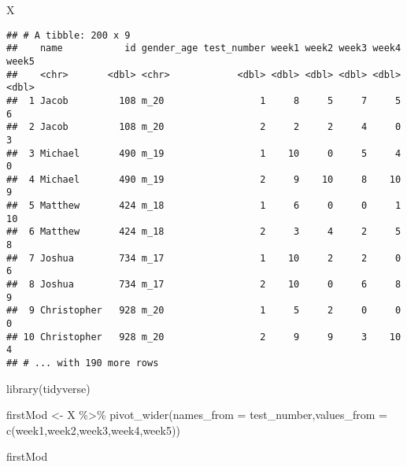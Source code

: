\documentclass[
]{article}
\newenvironment{Shaded}{\begin{snugshade}}{\end{snugshade}}
\newcommand{\AttributeTok}[1]{\textcolor[rgb]{0.77,0.63,0.00}{#1}}
\newcommand{\FunctionTok}[1]{\textcolor[rgb]{0.00,0.00,0.00}{#1}}
\newcommand{\NormalTok}[1]{#1}
\newcommand{\OtherTok}[1]{\textcolor[rgb]{0.56,0.35,0.01}{#1}}
\newcommand{\SpecialCharTok}[1]{\textcolor[rgb]{0.00,0.00,0.00}{#1}}
\begin{document}
\begin{Shaded}
\begin{Highlighting}[]
\NormalTok{X}
\end{Highlighting}
\end{Shaded}

\begin{verbatim}
## # A tibble: 200 x 9
##    name           id gender_age test_number week1 week2 week3 week4 week5
##    <chr>       <dbl> <chr>            <dbl> <dbl> <dbl> <dbl> <dbl> <dbl>
##  1 Jacob         108 m_20                 1     8     5     7     5     6
##  2 Jacob         108 m_20                 2     2     2     4     0     3
##  3 Michael       490 m_19                 1    10     0     5     4     0
##  4 Michael       490 m_19                 2     9    10     8    10     9
##  5 Matthew       424 m_18                 1     6     0     0     1    10
##  6 Matthew       424 m_18                 2     3     4     2     5     8
##  7 Joshua        734 m_17                 1    10     2     2     0     6
##  8 Joshua        734 m_17                 2    10     0     6     8     9
##  9 Christopher   928 m_20                 1     5     2     0     0     0
## 10 Christopher   928 m_20                 2     9     9     3    10     4
## # ... with 190 more rows
\end{verbatim}

\begin{Shaded}
\begin{Highlighting}[]
\FunctionTok{library}\NormalTok{(tidyverse)}

\NormalTok{firstMod }\OtherTok{\textless{}{-}}\NormalTok{ X }\SpecialCharTok{\%\textgreater{}\%} 
  \FunctionTok{pivot\_wider}\NormalTok{(}\AttributeTok{names\_from =}\NormalTok{ test\_number,}\AttributeTok{values\_from =} \FunctionTok{c}\NormalTok{(week1,week2,week3,week4,week5))}

\NormalTok{firstMod}
\end{Highlighting}
\end{Shaded}
\end{document}
